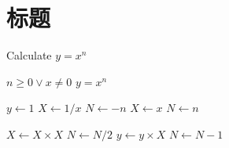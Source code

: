 \documentclass{thuthesis}
\begin{document}
\chapter{标题}
\clearpage

\START
\showoutput

\begin{algorithm}[htb]
  \caption{Calculate $y = x^n$}
  \label{alg1}
  \begin{algorithmic}
    \REQUIRE $n \geq 0 \vee x \neq 0$
    \ENSURE $y = x^n$

    \STATE $y \leftarrow 1$
       \STATE $X \leftarrow 1 / x$
       \STATE $N \leftarrow -n$
    \ELSE
       \STATE $X \leftarrow x$
       \STATE $N \leftarrow n$
    \ENDIF

        \STATE $X \leftarrow X \times X$
        \STATE $N \leftarrow N / 2$
      \ELSE[$N$ is odd]
        \STATE $y \leftarrow y \times X$
        \STATE $N \leftarrow N - 1$
      \ENDIF
    \ENDWHILE
  \end{algorithmic}
\end{algorithm}

\clearpage
\OMIT
\end{document}
